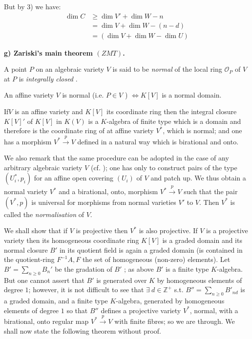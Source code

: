 But by 3) we have:
 \begin{align*}
   \dim  C & \geq \dim  V' + \dim  W -n\\
   &= \dim V + \dim W -(n-d)\\
   &= (\dim  V + \dim W -\dim  U) \tag*{Q.E.D.}
 \end{align*}  
 \hfill{

\noindent\textbf{g) Zariski's main theorem $(ZMT)$.}
  
 A point $P$ on an algebraic  variety $V$ is said  to be
 \textit{normal} of the local ring  $\mathscr{O}_P$ of $V$ at $P$ is
 \textit{ integrally closed }. 
 
 An affine variety $V$ is normal (i.e.   $P \in V$
 )  $\Longleftrightarrow  K [V]$ is a normal domain.  

If\pageoriginale $V$ is an affine variety and $K[V]$ its coordinate ring then the
integral closure 
$K[V]'$ of $K[V]$ in $K(V)$ is a $K$-algebra of finite type which is
a domain and therefore is the coordinate ring of at affine variety
$V^*$, which is normal; and one has a morphism $V^* \xrightarrow{p} V$
defined in a natural way which is birational and onto. 

We also remark that the same procedure can be adopted in the case of
any arbitrary algebraic variety $V$ (cf. \cite{7}); one has only to
construct pairs of the type $(U^*_i,p_i)$ for an affine open covering
$(U_i)$ of $V$ and patch up. We thus obtain a normal variety $V^*$ and
a birational, onto, morphism $V^*\xrightarrow{p} V$ such that the pair
$(V^*,p)$ is universal for morphisms from normal varieties $V'$ to
$V$. Then $V^*$ is called the \textit{normalisation} of $V$. 

We shall show that if $V$ is projective then $V^*$ is also
projective. If $V$ is a projective variety then its homogeneous
coordinate ring $K[V]$ is a graded domain and its normal closure $B'$
in its quotient field is again a graded domain (is contained in the
quotient-ring $F^{-1}A, F$ the set of homogeneous (non-zero)
elements). Let $B'= \sum\limits_{n \geq 0} B_n'$ be the gradation of
$B'$ ; as above $B'$ is a finite type $K$-algebra. But one cannot
assert that $B'$ is generated over $K$ by homogeneous elements of
degree $1$; however, it is not difficult to see that $\exists~ d  \in
\mathbb{Z}^+$ s.t. $B'' = \sum\limits_{n \geq 0} B'_{nd}$ is a graded
domain, and a finite type $K$-algebra, generated by homogeneous
elements of degree $1$ so that $B''$ defines a projective variety
$V^*$, normal, with a birational, onto regular map
$V^*{\xrightarrow{p}} V$ with finite fibres; so we are through. We
shall now state the following theorem without proof.  

}
